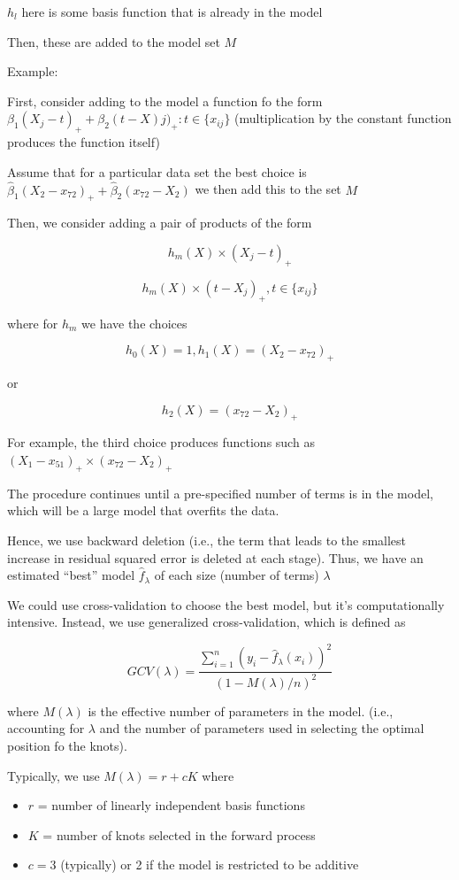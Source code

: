 \documentclass[
]{book}
\begin{document}
\(h_l\) here is some basis function that is already in the model

Then, these are added to the model set \(M\)

Example:

First, consider adding to the model a function fo the form \(\beta_1 (X_j - t)_+ + \beta_2(t-X)j)_+: t \in \{ x_{ij} \}\) (multiplication by the constant function produces the function itself)

Assume that for a particular data set the best choice is \(\hat{\beta}_1 (X_2 - x_{72})_+ + \hat{\beta}_2 (x_{72} - X_2)\) we then add this to the set \(M\)

Then, we consider adding a pair of products of the form

\[
h_m (X) \times (X_j - t)_+
\]

\[
h_m(X) \times (t- X_j)_+, t \in \{  x_{ij} \}
\]

where for \(h_m\) we have the choices

\[
h_0(X) = 1, h_1(X) = (X_2 - x_{72})_+
\]

or

\[
h_2(X) = (x_{72} - X_2)_+
\]

For example, the third choice produces functions such as \((X_1 - x_{51})_+ \times (x_{72} - X_2)_+\)

The procedure continues until a pre-specified number of terms is in the model, which will be a large model that overfits the data.

Hence, we use backward deletion (i.e., the term that leads to the smallest increase in residual squared error is deleted at each stage). Thus, we have an estimated ``best'' model \(\hat{f}_\lambda\) of each size (number of terms) \(\lambda\)

We could use cross-validation to choose the best model, but it's computationally intensive. Instead, we use generalized cross-validation, which is defined as

\[
GCV(\lambda) = \frac{\sum_{i=1}^n (y_i - \hat{f}_\lambda(x_i))^2}{(1- M(\lambda)/n)^2}
\]

where \(M(\lambda)\) is the effective number of parameters in the model. (i.e., accounting for \(\lambda\) and the number of parameters used in selecting the optimal position fo the knots).

Typically, we use \(M(\lambda) = r + cK\) where

\begin{itemize}
\item
  \(r\) = number of linearly independent basis functions
\item
  \(K\) = number of knots selected in the forward process
\item
  \(c = 3\) (typically) or 2 if the model is restricted to be additive
\end{itemize}
\end{document}
